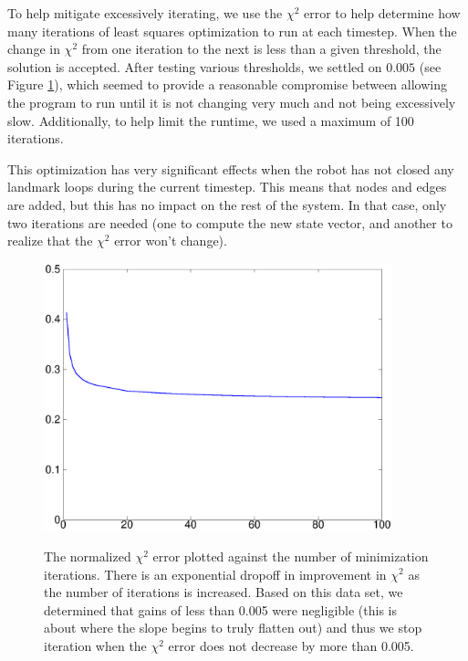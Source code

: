 \documentclass[12pt]{article}
\begin{document}
To help mitigate excessively iterating, we use the $\chi^2$ error to help determine how many iterations of least squares optimization to run at each timestep.  When the change in $\chi^2$ from one iteration to the next is less than a given threshold, the solution is accepted.  After testing various thresholds, we settled on $0.005$ (see Figure \ref{fig:chi2_iters}), which seemed to provide a reasonable compromise between allowing the program to run until it is not changing very much and not being excessively slow.  Additionally, to help limit the runtime, we used a maximum of 100 iterations.

This optimization has very significant effects when the robot has not closed any landmark loops during the current timestep. This means that nodes and edges are added, but this has no impact on the rest of the system. In that case, only two iterations are needed (one to compute the new state vector, and another to realize that the $\chi^2$ error won't change).

\begin{figure}[h!]
\centering
\includegraphics[width=0.9\textwidth]{figures/chi2_iters.eps}
\label{fig:chi2_iters}
\caption{The normalized $\chi^2$ error plotted against the number of minimization iterations.
    There is an exponential dropoff in improvement in $\chi^2$ as the number of iterations is
    increased. Based on this data set, we determined that gains of less than 0.005 were
    negligible (this is about where the slope begins to truly flatten out) and thus we stop
    iteration when the $\chi^2$ error does not decrease by more than 0.005.}
\end{figure}
\end{document}
